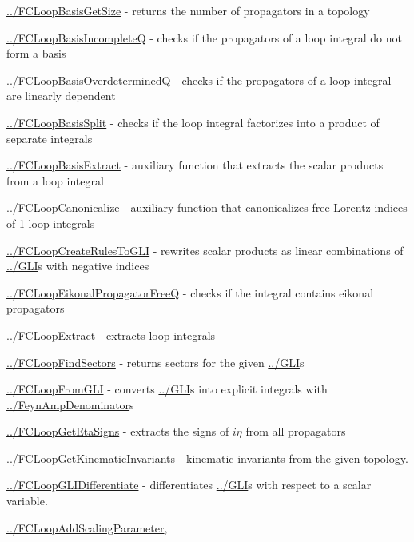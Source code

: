 \documentclass[../FeynCalcManual.tex]{subfiles}
\begin{document}
\begin{itemize}
{\item
  \hyperlink{../fcloopbasisgetsize}{../FCLoopBasisGetSize} - returns the
  number of propagators in a topology
\item
  \hyperlink{../fcloopbasisincompleteq}{../FCLoopBasisIncompleteQ} -
  checks if the propagators of a loop integral do not form a basis
\item
  \hyperlink{../fcloopbasisoverdeterminedq}{../FCLoopBasisOverdeterminedQ}
  - checks if the propagators of a loop integral are linearly dependent
\item
  \hyperlink{../fcloopbasissplit}{../FCLoopBasisSplit} - checks if the
  loop integral factorizes into a product of separate integrals
\item
  \hyperlink{../fcloopbasisextract}{../FCLoopBasisExtract} - auxiliary
  function that extracts the scalar products from a loop integral
\item
  \hyperlink{../fcloopcanonicalize}{../FCLoopCanonicalize} - auxiliary
  function that canonicalizes free Lorentz indices of 1-loop integrals
\item
  \hyperlink{../fcloopcreaterulestogli}{../FCLoopCreateRulesToGLI} -
  rewrites scalar products as linear combinations of
  \hyperlink{../gli}{../GLI}s with negative indices
\item
  \hyperlink{../fcloopeikonalpropagatorfreeq}{../FCLoopEikonalPropagatorFreeQ}
  - checks if the integral contains eikonal propagators
\item
  \hyperlink{../fcloopextract}{../FCLoopExtract} - extracts loop
  integrals
\item
  \hyperlink{../fcloopfindsectors}{../FCLoopFindSectors} - returns
  sectors for the given \hyperlink{../gli}{../GLI}s
\item
  \hyperlink{../fcloopfromgli}{../FCLoopFromGLI} - converts
  \hyperlink{../gli}{../GLI}s into explicit integrals with
  \hyperlink{../feynampdenominator}{../FeynAmpDenominator}s
\item
  \hyperlink{../fcloopgetetasigns}{../FCLoopGetEtaSigns} - extracts the
  signs of \(i \eta\) from all propagators
\item
  \hyperlink{../fcloopgetkinematicinvariants}{../FCLoopGetKinematicInvariants}
  - kinematic invariants from the given topology.
\item
  \hyperlink{../fcloopglidifferentiate}{../FCLoopGLIDifferentiate} -
  differentiates \hyperlink{../gli}{../GLI}s with respect to a scalar
  variable.
\item
  \hyperlink{../fcloopaddscalingparameter}{../FCLoopAddScalingParameter},
}
\end{itemize}
\end{document}
